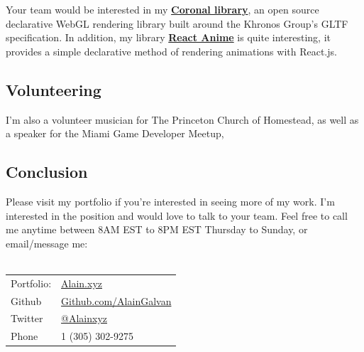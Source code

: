\documentclass[10pt,a4paper]{article}
\begin{document}
\begin{multicols}{2}
Your team would be interested in my \href{https://github.com/hyperfuse/coronal}{\textbf{Coronal library}}, an open source declarative WebGL rendering library built around the Khronos Group's GLTF specification. In addition, my library \href{https://github.com/hyperfuse/react-anime}{\textbf{React Anime}} is quite interesting, it provides a simple declarative method of rendering animations with React.js. 


\subsection*{Volunteering}

I'm also a volunteer musician for The Princeton Church of Homestead, as well as a speaker for the Miami Game Developer Meetup, 

\subsection*{Conclusion}

Please visit my portfolio if you're interested in seeing more of my work. I'm interested in the position and would love to talk to your team. Feel free to call me anytime between 8AM EST to 8PM EST Thursday to Sunday, or email/message me: \\ \\

\begin{center}
\begin{tabular}{ l l }
 Portfolio: &  \href{https://alain.xyz}{Alain.xyz} \\ 
 Github & \href{https://github.com/alaingalvan}{Github.com/AlainGalvan} \\  
 Twitter & \href{https://twitter.com/alainxyz}{@Alainxyz} \\
 Phone & \textsmaller{+}1 (305) 302-9275
\end{tabular}
\end{center}

\end{multicols}
\end{document}
